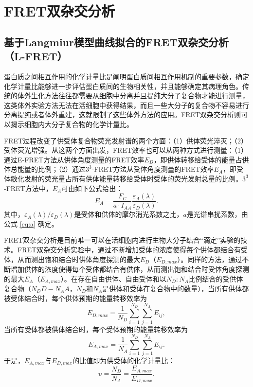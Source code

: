 \section{FRET双杂交分析}

\subsection{基于Langmiur模型曲线拟合的FRET双杂交分析（L-FRET）}

\ifshowtext
蛋白质之间相互作用的化学计量比是阐明蛋白质间相互作用机制的重要参数，确定化学计量比能够进一步评估蛋白质间的生物相关性，并且能够确定其病理角色。传统的体外生化方法往往都需要从细胞中分离并且提纯大分子复合物才能进行测量，这类体外实验方法无法在活细胞中获得结果，而且一些大分子的复合物不容易进行分离提纯或者体外重建，这就限制了这些体外方法的应用。FRET双杂交分析则可以揭示细胞内大分子复合物的化学计量比。

FRET过程改变了供受体复合物荧光发射谱的两个方面：（1）供体荧光淬灭；（2）受体荧光增强。从这两个方面出发，FRET效率也可以从两种方式进行测量：（1）通过E-FRET方法从供体角度测量的FRET效率$E_D$，即供体转移给受体的能量占供体总能量的比例；（2）通过$3^3$-FRET方法从受体角度测量的FRET效率$E_A$，即受体敏化发射的荧光量占所有供体能量转移给受体时受体的荧光发射总量的比例。$3^3$-FRET方法中，$E_A$可由如下公式给出：
\begin{equation}
    E_A = \frac{F_C}{a \cdot I_{AA}} \frac{\varepsilon_A(\lambda)}{\varepsilon_D(\lambda)}.
    \label{eq:ea}
\end{equation}
其中，$\varepsilon_A(\lambda) / \varepsilon_D(\lambda)$是受体和供体的摩尔消光系数之比，$a$是光谱串扰系数，由公式 \ref{eq:a} 确定。

FRET双杂交分析是目前唯一可以在活细胞内进行生物大分子结合“滴定”实验的技术。FRET双杂交分析实验中，通过不断增加受体的浓度使得每个供体都结合有受体，从而测出饱和结合时供体角度探测的最大$E_D$（$E_{D,max}$）。同样的方法，通过不断增加供体的浓度使得每个受体都结合有供体，从而测出饱和结合时受体角度探测的最大$E_A$（$E_{A,max}$）。在存在自由供体、自由受体和以$N_D:N_A$比例结合的受供体复合物（$N_DD-N_AA$，$N_D$和$N_A$是供体和受体在复合物中的数量），当所有供体都被受体结合时，每个供体预期的能量转移效率为
\begin{equation}
    E_{D,max}=\frac{1}{N_D} \sum_{i=1}^{N_D} \sum_{j=1}^{N_A} E_{ij},
\end{equation}
当所有受体都被供体结合时，每个受体预期的能量转移效率为
\begin{equation}
    E_{A,max}=\frac{1}{N_A} \sum_{i=1}^{N_D} \sum_{j=1}^{N_A} E_{ij}.
\end{equation}
于是，$E_{A,max}$与$E_{D,max}$的比值即为供受体的化学计量比：
\begin{equation}
    \upsilon = \frac{N_D}{N_A} = \frac{E_{A,max}}{E_{D,max}}. \label{eq:stoic}
\end{equation}

